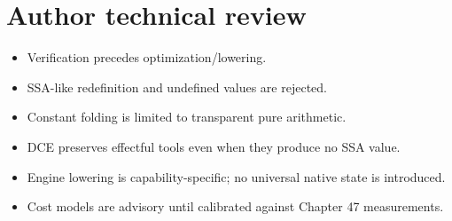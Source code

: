 \chapter*{Author technical review}
\begin{itemize}\item Verification precedes optimization/lowering.\item SSA-like redefinition and undefined values are rejected.\item Constant folding is limited to transparent pure arithmetic.\item DCE preserves effectful tools even when they produce no SSA value.\item Engine lowering is capability-specific; no universal native state is introduced.\item Cost models are advisory until calibrated against Chapter 47 measurements.\end{itemize}
